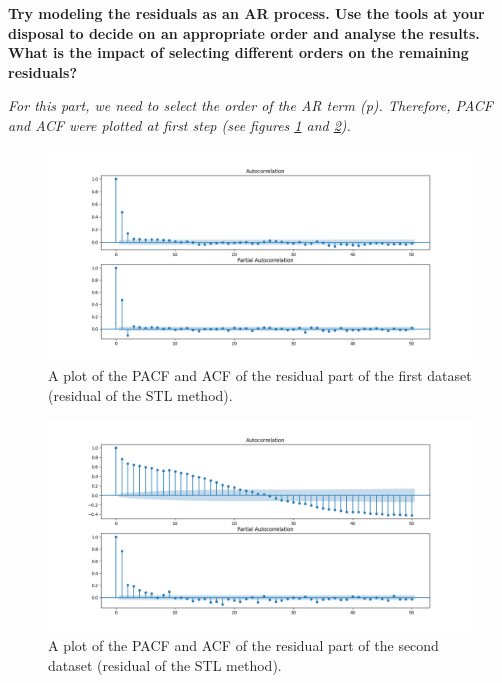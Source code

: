 \item \textbf{Try modeling the residuals as an AR process. Use the tools at your disposal to decide on an appropriate order and analyse the results. What is the impact of selecting different orders on the remaining residuals?}





\textit{For this part, we need to select the order of the \gls{AR} term (p). Therefore, \gls{PACF} and \gls{ACF} were plotted at first step (see figures \ref{fig:Ass1_D1_PACF_ACF_X} and \ref{fig:Ass1_D2_PACF_ACF_X}).}  

\begin{figure}[H]
    \centering
    \begin{minipage}[b]{1\textwidth}
        \includegraphics[width=\textwidth]{figures/Ass1/Ass1_D1_PACF_ACF_X.png}
    \end{minipage}
    \caption{A plot of the \gls{PACF} and \gls{ACF} of the residual part of the first dataset (residual of the STL method).}
    \label{fig:Ass1_D1_PACF_ACF_X}
\end{figure}

\begin{figure}[H]
    \centering
    \begin{minipage}[b]{1\textwidth}
        \includegraphics[width=\textwidth]{figures/Ass1/Ass1_D2_PACF_ACF_X.png}
    \end{minipage}
    \caption{A plot of the \gls{PACF} and \gls{ACF} of the residual part of the second dataset (residual of the STL method).}
    \label{fig:Ass1_D2_PACF_ACF_X}
\end{figure}


